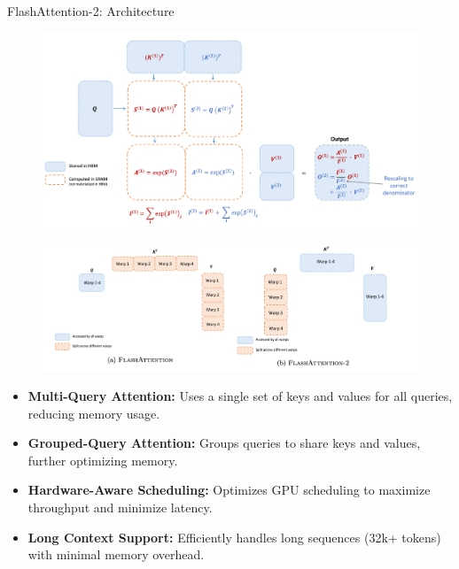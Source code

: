 \begin{frame}[allowframebreaks]{FlashAttention-2: Architecture}
    \begin{figure}
        \centering
        \includegraphics[height=0.88\textheight,width=1.08\textwidth,keepaspectratio]{images/recent-advance/flash-attention-2-arch.png}
    \end{figure}
\framebreak
    \begin{figure}
        \centering
        \includegraphics[height=0.88\textheight,width=1.08\textwidth,keepaspectratio]{images/recent-advance/flash-attention-2.png}
    \end{figure}
\framebreak
    \begin{itemize}
        \item \textbf{Multi-Query Attention:} Uses a single set of keys and values for all queries, reducing memory usage.
        \item \textbf{Grouped-Query Attention:} Groups queries to share keys and values, further optimizing memory.
        \item \textbf{Hardware-Aware Scheduling:} Optimizes GPU scheduling to maximize throughput and minimize latency.
        \item \textbf{Long Context Support:} Efficiently handles long sequences (32k+ tokens) with minimal memory overhead.
    \end{itemize}
\framebreak
    \begin{figure}

\end{figure}
\end{frame}
